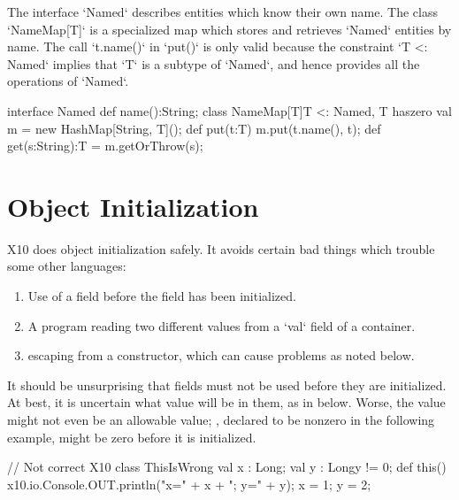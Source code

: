 \begin{ex}
The interface \xcd`Named` describes entities which know their own name.  The
class \xcd`NameMap[T]` is a specialized map which stores and retrieves
\xcd`Named` entities by name.  The call \xcd`t.name()` in \xcd`put()` is only
valid because the constraint \xcd`{T <: Named}` implies that \xcd`T` is a
subtype of \xcd`Named`, and hence provides all the operations of \xcd`Named`. 
\begin{xten}
interface Named { def name():String; }
class NameMap[T]{T <: Named, T haszero} {
   val m = new HashMap[String, T]();
   def put(t:T) { m.put(t.name(), t); }
   def get(s:String):T = m.getOrThrow(s);
}
\end{xten}
%


\end{ex}





\section{Object Initialization}
\label{ObjectInitialization}


X10 does object initialization safely.  It avoids certain bad things which
trouble some other languages:
\begin{enumerate}
\item Use of a field before the field has been initialized.
\item A program reading two different values from a \xcd`val` field of a
      container. 
\item {} escaping from a constructor, which can cause problems as
      noted below. 

\end{enumerate}

It should be unsurprising that fields must not be used before they are
initialized. At best, it is uncertain what value will be in them, as in
 below. Worse, the value might not even be an allowable value; ,
declared to be nonzero in the following example, might be zero before it is
initialized.
\begin{xten}
// Not correct X10
class ThisIsWrong {
  val x : Long;
  val y : Long{y != 0};
  def this() {
    x10.io.Console.OUT.println("x=" + x + "; y=" + y);
    x = 1; y = 2;
  }
}
\end{xten}

